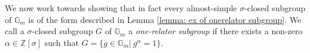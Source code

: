 \documentclass[oneside,reqno]{amsart}
\newtheorem{lemma}[theo]{Lemma}
\theoremstyle{definition}
\newcommand{\s}{\sigma}
\newcommand{\Gm}{\mathbb{G}_m}
\newcommand{\kn}{k^{[n]}}
\newcommand{\ZZ}{\mathbb{Z}}
\newcommand{\pt}{{\rm{(P3$^u$)}}}
\newcommand{\ptweak}{{\rm{(P3)}}}
\begin{document}
%	
%


We now work towards showing that in fact every almost-simple $\s$-closed subgroup of $\Gm$ is of the form described in Lemma \ref{lemma: ex of onerelator subgroup}. We call a $\s$-closed subgroup $G$ of $\Gm$ a \emph{one-relator subgroup} if there exists a non-zero $\alpha\in \ZZ[\s]$ such that $G=\{g\in\Gm|\ g^\alpha=1\}$.
\end{document}
